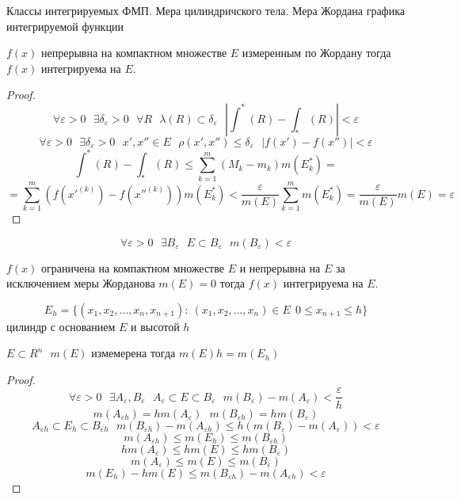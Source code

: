 \begin{title}[\Large]
  Классы интегрируемых ФМП. Мера цилиндричского тела. Мера Жордана графика
  интегрируемой функции
\end{title}

\begin{theorem}
  $f(x)$ непрерывна на компактном множестве $E$ измеренным по Жордану тогда
  $f(x)$ интегрируема на $E$.
\end{theorem}

\begin{proof}
  $$
  \forall \varepsilon > 0 ~~~ \exists \delta_{\varepsilon} > 0 ~~~ \forall R
  ~~~  \lambda(R) \subset \delta_{\varepsilon} ~~~
  \left| \int^*(R) - \int_*(R) \right| < \varepsilon
  $$
  $$
  \forall \varepsilon > 0 ~~~ \exists \delta_{\varepsilon} > 0 ~~~
  x', x'' \in E ~~~ \rho (x', x'') \le \delta_{\varepsilon} ~~~
  |f(x') - f(x'')| < \varepsilon
  $$
  $$
  \int^*(R) - \int_*(R) \le \sum_{k=1}^m(M_k - m_k)m(E_k^*) =
  $$
  $$
  = \sum_{k=1}^m (f(x'^{(k)}) - f(x''^{(k)}))m(E_k^*) < \frac{\varepsilon}{m(E)}
  \sum_{k=1}^m m(E_k^*) = \frac{\varepsilon}{m(E)} m(E) = \varepsilon
  $$
\end{proof}

\begin{define}
  $$
  \forall \varepsilon > 0 ~~~ \exists B_{\varepsilon} ~~~ E \subset
  B_{\varepsilon} ~~~ m(B_{\varepsilon}) < \varepsilon
  $$
\end{define}

\begin{theorem}
  $f(x)$ ограничена на компактном множестве $E$ и непрерывна на $E$ за
  исключением меры Жорданова $m(E)=0$ тогда $f(x)$ интегрируема на $E$.
\end{theorem}

\begin{define}[цилиндра]
  $$
  E_h = \{ (x_1, x_2, \ldots, x_n, x_{n+1}): ~ (x_1, x_2, \ldots, x_n) \in E
  ~~ 0 \le x_{n+1} \le h\}
  $$
  цилиндр с основанием $E$ и высотой $h$
\end{define}

\begin{block}[Лемма]
  $E \subset R^n ~~~ m(E)$ измемерена тогда $m(E)h = m(E_h)$
\end{block}

\begin{proof}
  $$
  \forall \varepsilon > 0 ~~~ \exists A_{\varepsilon}, B_{\varepsilon} ~~~
  A_{\varepsilon} \subset E \subset B_{\varepsilon}
  ~~~ m(B_{\varepsilon}) - m(A_{\varepsilon}) < \frac{\varepsilon}{h}
  $$
  $$
  m(A_{\varepsilon h}) = hm(A_{\varepsilon}) ~~~ m(B_{\varepsilon h}) =
  hm(B_{\varepsilon})
  $$
  $$
  A_{\varepsilon h} \subset E_h \subset B_{\varepsilon h} ~~~
  m(B_{\varepsilon h}) - m(A_{\varepsilon h}) \le h(m(B_{\varepsilon}) -
  m(A_{\varepsilon})) < \varepsilon
  $$
  $$
  m(A_{\varepsilon h}) \le m(E_h) \le m(B_{\varepsilon h})
  $$
  $$
  hm(A_{\varepsilon}) \le hm(E) \le hm(B_{\varepsilon})
  $$
  $$
  m(A_{\varepsilon}) \le m(E) \le m(B_{\varepsilon})
  $$
  $$
  m(E_h) - hm(E) \le m(B_{\varepsilon h}) - m(A_{\varepsilon h}) < \varepsilon
  $$
\end{proof}

